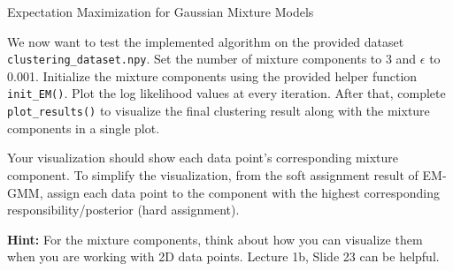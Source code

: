 \documentclass[
	english,
        solution=true
	]{tudaexercise}
\begin{document}
\begin{task}[points=6 + 4]{Expectation Maximization for Gaussian Mixture Models}
\begin{subtask}[points=6,title=EM Implementation]
\begin{solution}

\end{solution}

\end{subtask}

\begin{subtask}[points=4]
We now want to test the implemented algorithm on the provided dataset \texttt{clustering\_dataset.npy}. Set the number of mixture components to 3 and $\epsilon$ to 0.001. Initialize the mixture components using the provided helper function \texttt{init\_EM()}. Plot the log likelihood values at every iteration. After that, complete \texttt{plot\_results()} to visualize the final clustering result along with the mixture components in a single plot. 

Your visualization should show each data point's corresponding mixture component. To simplify the visualization, from the soft assignment result of EM-GMM, assign each data point to the component with the highest corresponding responsibility/posterior (hard assignment).

\textbf{Hint:} For the mixture components, think about how you can visualize them when you are working with 2D data points. Lecture 1b, Slide 23 can be helpful.
\end{subtask}

\begin{solution}

\end{solution}
\end{task}

\newpage
\end{document}
